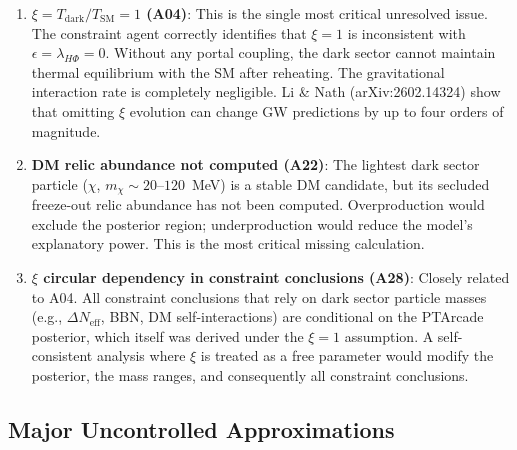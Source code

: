 \documentclass[12pt,a4paper]{article}
\begin{document}
\begin{enumerate}[label=\textbf{A\arabic*}.]
\item \textbf{$\xi = T_\text{dark}/T_\text{SM} = 1$ (A04)}: This is the single most critical unresolved issue. The constraint agent correctly identifies that $\xi = 1$ is inconsistent with $\epsilon = \lambda_{H\Phi} = 0$. Without any portal coupling, the dark sector cannot maintain thermal equilibrium with the SM after reheating. The gravitational interaction rate is completely negligible. Li \& Nath (arXiv:2602.14324) show that omitting $\xi$ evolution can change GW predictions by up to four orders of magnitude.

\item \textbf{DM relic abundance not computed (A22)}: The lightest dark sector particle ($\chi$, $m_\chi \sim 20$--$120$~MeV) is a stable DM candidate, but its secluded freeze-out relic abundance has not been computed. Overproduction would exclude the posterior region; underproduction would reduce the model's explanatory power. This is the most critical missing calculation.

\item \textbf{$\xi$ circular dependency in constraint conclusions (A28)}: Closely related to A04. All constraint conclusions that rely on dark sector particle masses (e.g., $\Delta N_{\text{eff}}$, BBN, DM self-interactions) are conditional on the PTArcade posterior, which itself was derived under the $\xi = 1$ assumption. A self-consistent analysis where $\xi$ is treated as a free parameter would modify the posterior, the mass ranges, and consequently all constraint conclusions.
\end{enumerate}

\subsection{Major Uncontrolled Approximations}
\end{document}
